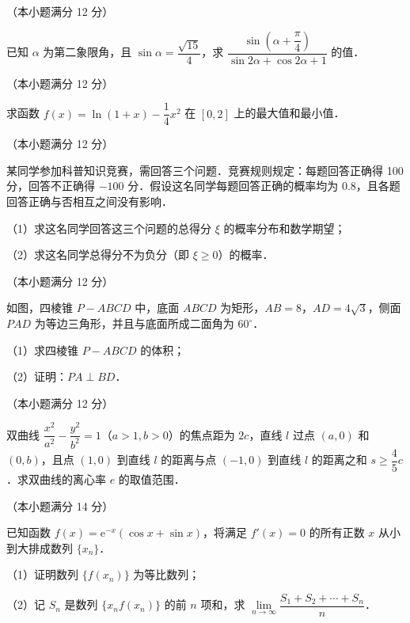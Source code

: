 \begin{question}
（本小题满分 12 分）

已知 $\alpha$ 为第二象限角，且 $\sin\alpha=\dfrac{\sqrt{15}}{4}$，求 $\dfrac{\sin\left(\alpha+\dfrac{\pi}{4}\right)}{\sin 2\alpha+\cos 2\alpha+1}$ 的值．

\end{question}
\begin{question}
（本小题满分 12 分）

求函数 $f(x)=\ln(1+x)-\dfrac{1}{4}x^2$ 在 $[0,2]$ 上的最大值和最小值．

\end{question}
\begin{question}
（本小题满分 12 分）

某同学参加科普知识竞赛，需回答三个问题．竞赛规则规定：每题回答正确得 100 分，回答不正确得 $-100$ 分．假设这名同学每题回答正确的概率均为 0.8，且各题回答正确与否相互之间没有影响．

（1）求这名同学回答这三个问题的总得分 $\xi$ 的概率分布和数学期望；

（2）求这名同学总得分不为负分（即 $\xi\geqslant 0$）的概率．

\Needspace{0.4\textheight}
\end{question}
\begin{question}
（本小题满分 12 分）

如图，四棱锥 $P-ABCD$ 中，底面 $ABCD$ 为矩形，$AB=8$，$AD=4\sqrt{3}$，侧面 $PAD$ 为等边三角形，并且与底面所成二面角为 $60^\circ$．
\nopagebreak[4]
\begin{center}\end{center}
\nopagebreak[4]
（1）求四棱锥 $P-ABCD$ 的体积；

（2）证明：$PA\perp BD$．

\end{question}
\begin{question}
（本小题满分 12 分）

双曲线 $\dfrac{x^2}{a^2}-\dfrac{y^2}{b^2}=1$（$a>1,b>0$）的焦点距为 $2c$，直线 $l$ 过点 $(a,0)$ 和 $(0,b)$，且点 $(1,0)$ 到直线 $l$ 的距离与点 $(-1,0)$ 到直线 $l$ 的距离之和 $s\geqslant\dfrac{4}{5}c$．求双曲线的离心率 $e$ 的取值范围．

\end{question}
\begin{question}
（本小题满分 14 分）

已知函数 $f(x)=\mathrm{e}^{-x}(\cos x+\sin x)$，将满足 $f'(x)=0$ 的所有正数 $x$ 从小到大排成数列 $\{x_n\}$．

（1）证明数列 $\{f(x_n)\}$ 为等比数列；

（2）记 $S_n$ 是数列 $\{x_n f(x_n)\}$ 的前 $n$ 项和，求 $\lim\limits_{n\to\infty}\dfrac{S_1+S_2+\cdots+S_n}{n}$．

\end{question}